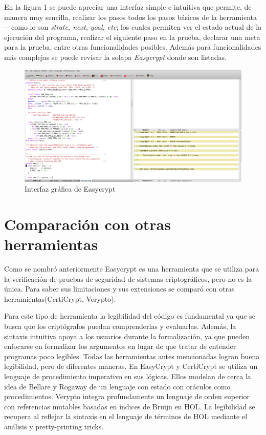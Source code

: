 \documentclass[runningheads]{llncs}
\begin{document}
En la figura 1 se puede apreciar una interfaz simple e intuitiva que permite, de manera muy sencilla, realizar los pasos todos los pasos básicos de la herramienta—como lo son \textit{strate, next, goal, etc}; los cuales permiten ver el estado actual de la ejecución del programa, realizar el siguiente paso en la prueba, declarar una meta para la prueba, entre otras funcionalidades posibles. Además para funcionalidades más complejas se puede revisar la solapa \textit{Easycrypt} donde son listadas.

\begin{figure}[H]
\includegraphics[width=\textwidth]{figura1.png}
\caption{Interfaz gráfica de Easycrypt} \label{fig1}
\end{figure}

\section{Comparación con otras herramientas}
Como se nombró anteriormente Easycrypt es una herramienta que se utiliza para la verificación de pruebas de seguridad de sistemas criptográficos, pero no es la única. Para saber sus limitaciones y sus extensiones se comparó con otras herramientas(CertiCrypt, Verypto).

 Para este tipo de herramienta la legibilidad del código es fundamental ya que se busca que los criptógrafos puedan comprenderlas y evaluarlas. Además, la sintaxis intuitiva apoya a los usuarios durante la formalización, ya que pueden enfocarse en formalizar los argumentos en lugar de que tratar de entender programas poco legibles. Todas las herramientas antes mencionadas logran buena legibilidad, pero de diferentes maneras. En EasyCrypt y CertiCrypt se utiliza un lenguaje de procedimiento imperativo en sus lógicas. Ellos modelan de cerca la idea de Bellare y Rogaway de un lenguaje con estado con oráculos como procedimientos\cite{ref_article3}. Verypto integra profundamente un lenguaje de orden superior con referencias mutables basadas en índices de Bruijn en HOL\cite{ref_article4}. La legibilidad se recupera al reflejar la sintaxis en el lenguaje de términos de HOL mediante el análisis y pretty-printing tricks.
\end{document}
